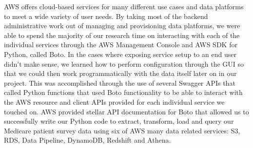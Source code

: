 AWS offers cloud-based services for many different use cases and data 
platforms to meet a wide variety of user needs. By taking most of the backend 
administrative work out of managing and provisioning data platforms, we were 
able to spend the majority of our research time on interacting with each of 
the individual services through the AWS Management Console and AWS SDK for 
Python, called Boto. In the cases where exposing service setup to an end user 
didn't make sense, we learned how to perform configuration through the GUI so 
that we could then work programmatically with the data itself later on in our 
project. This was accomplished through the use of several Swagger APIs that 
called Python functions that used Boto functionality to be able to interact 
with the AWS resource and client APIs provided for each individual service we 
touched on. AWS provided stellar API documentation for Boto that allowed us to 
successfully write our Python code to extract, transform, load and query our 
Medicare patient survey data using six of AWS many data related services: S3, 
RDS, Data Pipeline, DynamoDB, Redshift and Athena.    


 

